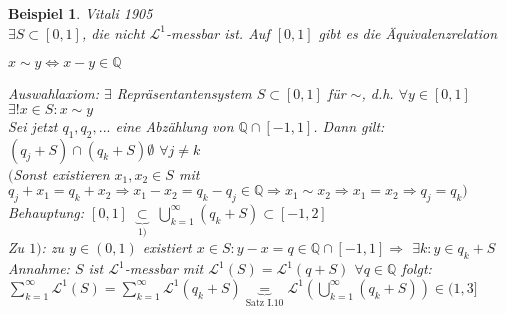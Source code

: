 \documentclass[11pt]{memoir}
\theoremstyle{break}
\newtheorem{Beispiel}{Beispiel}[chapter]
\begin{document}
\begin{Beispiel}
\emph{Vitali 1905} \\
$\exists S \subset [0, 1]$, die nicht $\mathscr L^1$-messbar ist. Auf $[0, 1]$ gibt es die Äquivalenzrelation 
\begin{center}
	$x \sim y \Leftrightarrow x - y \in \mathbb Q$
\end{center}
Auswahlaxiom: $\exists$ Repräsentantensystem $S \subset [0, 1]$ für $\sim$, d.h. $\forall y \in [0, 1]$ $\exists! x \in S: x \sim y$ \\
Sei jetzt $q_1, q_2, ...$ eine Abzählung von $\mathbb Q \cap [-1, 1]$. Dann gilt: $(q_j + S) \cap (q_k +S)  \emptyset $ $\forall j \ne k$ \\
$($Sonst existieren $x_1, x_2 \in S$ mit $q_j +x_1 = q_k + x_2 \Rightarrow x_1-x_2 = q_k -q_j \in \mathbb Q \Rightarrow x_1 \sim x_2  \Rightarrow x_1 = x_2 \Rightarrow q_j = q_k $\blitzd $ )$ \\

\emph{Behauptung:} $[0, 1]$ $\underbrace{\subset}_{1)}$ $\bigcup\limits_{k=1}^\infty
 (q_k + S) \subset [-1, 2]$ \\
 Zu $1)$: zu $y \in (0, 1)$ existiert $x \in S: y - x = q \in \mathbb Q \cap [-1, 1] \Rightarrow$ $\exists k: y \in q_k + S$ \\
\emph{Annahme:} $S$ ist $\mathscr L^1$-messbar mit $\mathscr L^1(S) = \mathscr L^1(q + S)$ $\forall q \in \mathbb Q$ folgt: $\sum\limits_{k=1}^\infty \mathscr L^1(S) = \sum\limits_{k=1}^\infty \mathscr L^1(q_k + S) \underbrace{=}_ {\text{Satz I.10}} \mathscr L^1\left(\bigcup\limits_{k=1}^\infty (q_k + S) \right) \in (1, 3]$ \blitzd

\end{Beispiel}
\end{document}
